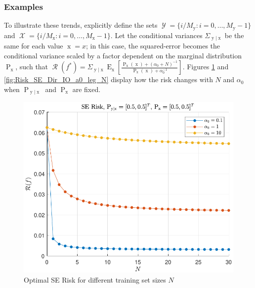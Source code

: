 \documentclass{article}
\DeclareMathOperator{\xrm}{\mathrm{x}}
\DeclareMathOperator{\yrm}{\mathrm{y}}
\DeclareMathOperator{\Prm}{\mathrm{P}}
\DeclareMathOperator{\Erm}{\mathrm{E}}
\DeclareMathOperator{\Xcal}{\mathcal{X}}
\DeclareMathOperator{\Ycal}{\mathcal{Y}}
\DeclareMathOperator{\Rcal}{\mathcal{R}}
\begin{document}
\subsubsection{Examples}

To illustrate these trends, explicitly define the sets $\Ycal = \{ i/M_{\yrm} : i = 0,\ldots,M_{\yrm}-1 \}$ and $\Xcal = \{ i/M_{\xrm} : i = 0,\ldots,M_{\xrm}-1 \}$. Let the conditional variances $\Sigma_{\yrm | \xrm}$ be the same for each value $\xrm = x$; in this case, the squared-error becomes the conditional variance scaled by a factor dependent on the marginal distribution $\Prm_{\xrm}$, such that $\Rcal(f^*) = \Sigma_{\yrm | \xrm} \Erm_{\xrm} \left[ \frac{\Prm_{\xrm}(\xrm) + (\alpha_0+N)^{-1}}{\Prm_{\xrm}(\xrm) + \alpha_0^{-1}} \right]$.  Figures \ref{fig:Risk_SE_Dir_IO_N_leg_a0} and \ref{fig:Risk_SE_Dir_IO_a0_leg_N} display how the risk changes with $N$ and $\alpha_0$ when $\Prm_{\yrm|\xrm}$ and $\Prm_{\xrm}$ are fixed.

\begin{figure}
\centering
\includegraphics[width=1.0\linewidth]{Risk_SE_Dir_IO_N_leg_a0.pdf}
\caption{Optimal SE Risk for different training set sizes $N$}
\label{fig:Risk_SE_Dir_IO_N_leg_a0}
\end{figure}
\end{document}

